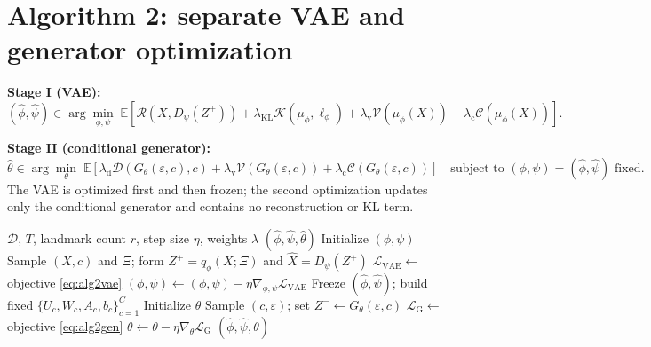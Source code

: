 \documentclass[10pt]{article}
\newcommand{\unique}[1]{\textcolor{algblue}{#1}}
\begin{document}
\section*{Algorithm 2: separate VAE and generator optimization}

\textbf{Stage I (VAE):}
\begin{equation}
 (\widehat\phi,\widehat\psi)\in\arg\min_{\phi,\psi}\;
 \mathbb E\!\left[
 \mathcal R(X,D_\psi(Z^+))
 +\lambda_{\mathrm{KL}}\mathcal K(\mu_\phi,\ell_\phi)
 +\lambda_{\mathrm v}\mathcal V(\mu_\phi(X))
 +\lambda_{\mathrm c}\mathcal C(\mu_\phi(X))
 \right].
 \label{eq:alg2vae}
\end{equation}

\textbf{Stage II (conditional generator):}
\begin{equation}
 \boxed{
 \widehat\theta\in\arg\min_{\theta}\;
 \mathbb E\!\left[
 \lambda_{\mathrm d}\mathcal D(G_\theta(\varepsilon,c),c)
 +\lambda_{\mathrm v}\mathcal V(G_\theta(\varepsilon,c))
 +\lambda_{\mathrm c}\mathcal C(G_\theta(\varepsilon,c))
 \right]
 }
 \quad\text{subject to }(\phi,\psi)=(\widehat\phi,\widehat\psi)\text{ fixed}.
 \label{eq:alg2gen}
\end{equation}
\noindent
\unique{The VAE is optimized first and then frozen; the second optimization updates only the conditional generator and contains no reconstruction or KL term.}

\begin{algorithm}[H]
\caption{Algorithm 2 training}
\begin{algorithmic}[1]
\Require $\mathcal D$, $T$, landmark count $r$, step size $\eta$, weights $\lambda$
\Ensure $(\widehat\phi,\widehat\psi,\widehat\theta)$
\State Initialize $(\phi,\psi)$
    \State Sample $(X,c)$ and $\Xi$; form $Z^+=q_\phi(X;\Xi)$ and $\widehat X=D_\psi(Z^+)$
    \State $\mathcal L_{\mathrm{VAE}}\gets$ objective \eqref{eq:alg2vae}
    \State $(\phi,\psi)\gets(\phi,\psi)-\eta\nabla_{\phi,\psi}\mathcal L_{\mathrm{VAE}}$
\EndFor
\State Freeze $(\widehat\phi,\widehat\psi)$; build fixed $\{U_c,W_c,A_c,b_c\}_{c=1}^C$
\State Initialize $\theta$
    \State Sample $(c,\varepsilon)$; set $Z^-\gets G_\theta(\varepsilon,c)$
    \State $\mathcal L_{\mathrm{G}}\gets$ objective \eqref{eq:alg2gen}
    \State $\theta\gets\theta-\eta\nabla_\theta\mathcal L_{\mathrm{G}}$
\EndFor
\State \Return $(\widehat\phi,\widehat\psi,\theta)$
\end{algorithmic}
\end{algorithm}
\end{document}
